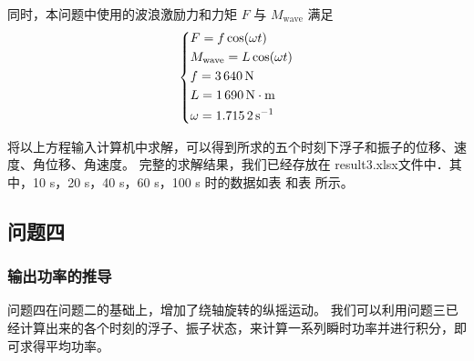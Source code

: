同时，本问题中使用的波浪激励力和力矩 $F$ 与 $M_\text{wave}$ 满足
\begin{equation*}
    \left\{
    \begin{aligned}
        & F=f\cos(\omega t) \\
        & M_\text{wave}=L\cos(\omega t) \\
        & f=\N{3640}\,\mathrm{N} \\
        & L=\N{1690}\,\mathrm{N}\cdot\mathrm{m} \\
        & \omega=\N{1.7152}\,\mathrm{s}^{-1} \\
    \end{aligned}    
    \right.
\end{equation*}    

将以上方程输入计算机中求解，可以得到所求的五个时刻下浮子和振子的位移、速度、角位移、角速度。
完整的求解结果，我们已经存放在 result3.xlsx文件中．其
中，10 s，20 s，40 s，60 s，100 s 时的数据如表 和表 所示。




\subsection{问题四}

\subsubsection{输出功率的推导}

问题四在问题二的基础上，增加了绕轴旋转的纵摇运动。
我们可以利用问题三已经计算出来的各个时刻的浮子、振子状态，来计算一系列瞬时功率并进行积分，即可求得平均功率。

